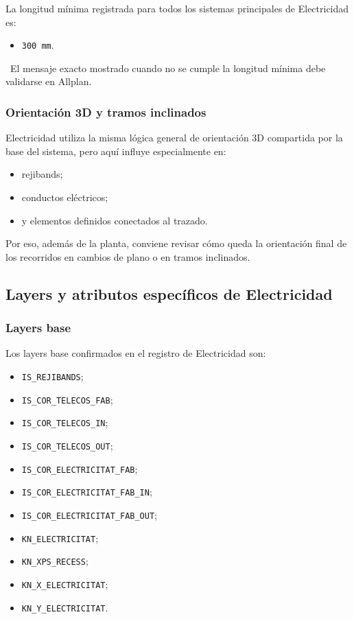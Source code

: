 La longitud mínima registrada para todos los sistemas principales de Electricidad es:

\begin{itemize}
\item \texttt{300 mm}.
\end{itemize}

\pendingtag\ El mensaje exacto mostrado cuando no se cumple la longitud mínima debe validarse en Allplan.

\subsubsection{Orientación 3D y tramos inclinados}

Electricidad utiliza la misma lógica general de orientación 3D compartida por la base del sistema, pero aquí influye especialmente en:

\begin{itemize}
\item rejibands;
\item conductos eléctricos;
\item y elementos definidos conectados al trazado.
\end{itemize}

Por eso, además de la planta, conviene revisar cómo queda la orientación final de los recorridos en cambios de plano o en tramos inclinados.


\subsection{Layers y atributos específicos de Electricidad}

\subsubsection{Layers base}

Los layers base confirmados en el registro de Electricidad son:

\begin{itemize}
\item \texttt{IS\_REJIBANDS};
\item \texttt{IS\_COR\_TELECOS\_FAB};
\item \texttt{IS\_COR\_TELECOS\_IN};
\item \texttt{IS\_COR\_TELECOS\_OUT};
\item \texttt{IS\_COR\_ELECTRICITAT\_FAB};
\item \texttt{IS\_COR\_ELECTRICITAT\_FAB\_IN};
\item \texttt{IS\_COR\_ELECTRICITAT\_FAB\_OUT};
\item \texttt{KN\_ELECTRICITAT};
\item \texttt{KN\_XPS\_RECESS};
\item \texttt{KN\_X\_ELECTRICITAT};
\item \texttt{KN\_Y\_ELECTRICITAT}.
\end{itemize}

